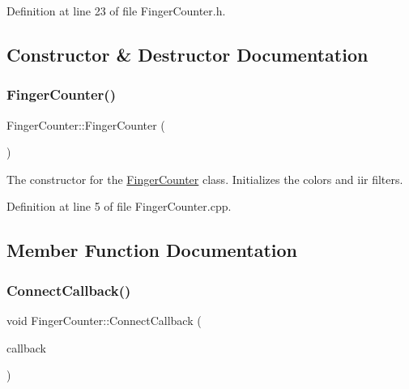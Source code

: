 Definition at line 23 of file Finger\+Counter.\+h.



\subsection{Constructor \& Destructor Documentation}
\mbox{\label{class_gesture_detection_1_1_finger_counter_a2f6f5bc97506e87dc7acc6e02579a916}} 
\subsubsection{\texorpdfstring{Finger\+Counter()}{FingerCounter()}}
{\footnotesize\ttfamily Finger\+Counter\+::\+Finger\+Counter (\begin{DoxyParamCaption}\item[{void}]{ }\end{DoxyParamCaption})}

The constructor for the \hyperlink{class_gesture_detection_1_1_finger_counter}{Finger\+Counter} class. Initializes the colors and iir filters. 

Definition at line 5 of file Finger\+Counter.\+cpp.



\subsection{Member Function Documentation}
\mbox{\label{class_gesture_detection_1_1_finger_counter_a5b5aabaa39ff05c70a873b4c2a7869f9}} 
\subsubsection{\texorpdfstring{Connect\+Callback()}{ConnectCallback()}}
{\footnotesize\ttfamily void Finger\+Counter\+::\+Connect\+Callback (\begin{DoxyParamCaption}\item[{\hyperlink{class_gestro_1_1_capture_and_detect_callback_interface}{Capture\+And\+Detect\+Callback\+Interface} $\ast$}]{callback }\end{DoxyParamCaption})}

